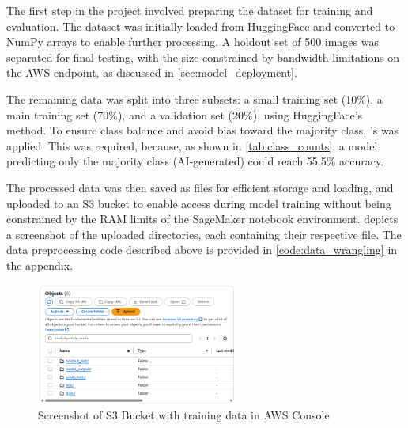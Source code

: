 The first step in the project involved preparing the dataset for training and evaluation. The dataset was initially loaded from HuggingFace and converted to NumPy arrays to enable further processing. A holdout set of 500 images was separated for final testing, with the size constrained by bandwidth limitations on the AWS endpoint, as discussed in \cref{sec:model_deployment}. 

The remaining data was split into three subsets: a small training set (10\%), a main training set (70\%), and a validation set (20\%), using HuggingFace's  method. To ensure class balance and avoid bias toward the majority class, 's  was applied. This was required, because, as shown in \cref{tab:class_counts}, a model predicting only the majority class (AI-generated) could reach 55.5\% accuracy. 

The processed data was then saved as  files for efficient storage and loading, and uploaded to an S3 bucket to enable access during model training without being constrained by the RAM limits of the SageMaker notebook environment.  depicts a screenshot of the uploaded directories, each containing their respective  file. The data preprocessing code described above is provided in \cref{code:data_wrangling} in the appendix. 

\begin{figure}[h]
    \centering
    \includegraphics[width=250px]{figures/s3_bucket_screenshot.png} %
    \centering
    \caption{Screenshot of S3 Bucket with training data in AWS Console} %
    \label{fig:s3_bucket} %
\end{figure}


